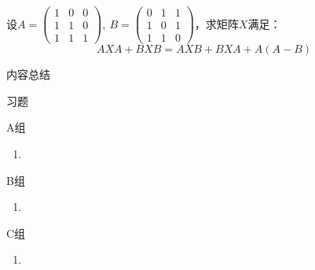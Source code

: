 \begin{example}
	设$A=\begin{pmatrix}1 & 0 & 0 \\ 1 & 1 & 0 \\ 1 & 1 & 1\end{pmatrix},\ 
	B=\begin{pmatrix}0 & 1 & 1 \\ 1 & 0 & 1 \\ 1 & 1 & 0\end{pmatrix}$，求矩阵$X$满足：	
	$$AXA+BXB=AXB+BXA+A(A-B)$$
\end{example}

\vspace{2ex} 
\centerline{\heiti \Large 内容总结}

\vspace{2ex} 

\centerline{\heiti \Large 习题}
\vspace{2ex} 
{\kaishu }
\begin{flushright}
    \kaishu

\end{flushright}
\centerline{\heiti A组}
\begin{enumerate}
	\item 
\end{enumerate}
\centerline{\heiti B组}
\begin{enumerate}
	\item 
\end{enumerate}
\centerline{\heiti C组}
\begin{enumerate}
	\item 
\end{enumerate}